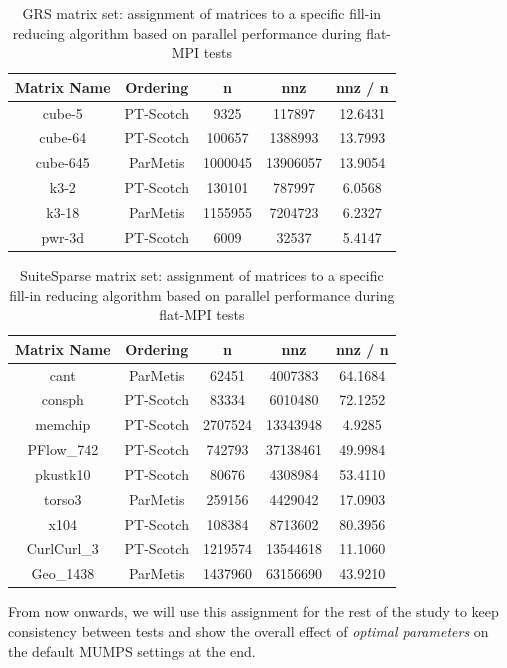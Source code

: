 \begin{table}[htpb]
\centering
\begin{tabular}{|c|c|c|c|c|}
\hline
Matrix Name & Ordering  & n       & nnz      & nnz / n \\ \hline
cube-5      & PT-Scotch & 9325    & 117897   & 12.6431 \\ \hline
cube-64     & PT-Scotch & 100657  & 1388993  & 13.7993 \\ \hline
cube-645    & ParMetis  & 1000045 & 13906057 & 13.9054 \\ \hline
k3-2        & PT-Scotch & 130101  & 787997   & 6.0568  \\ \hline
k3-18       & ParMetis  & 1155955 & 7204723  & 6.2327  \\ \hline
pwr-3d      & PT-Scotch & 6009    & 32537    & 5.4147  \\ \hline
\end{tabular}
\caption{GRS matrix set: assignment of matrices to a specific fill-in reducing algorithm based on parallel performance during flat-MPI tests}
\label{table:GRS-ordering-assignment}
\end{table}


\begin{table}[htpb]
\centering
\begin{tabular}{|c|c|c|c|c|}
\hline
Matrix Name & Ordering  & n       & nnz      & nnz / n \\ \hline
cant        & ParMetis  & 62451   & 4007383  & 64.1684 \\ \hline
consph      & PT-Scotch & 83334   & 6010480  & 72.1252 \\ \hline
memchip     & PT-Scotch & 2707524 & 13343948 & 4.9285  \\ \hline
PFlow\_742  & PT-Scotch & 742793  & 37138461 & 49.9984 \\ \hline
pkustk10    & PT-Scotch & 80676   & 4308984  & 53.4110 \\ \hline
torso3      & ParMetis  & 259156  & 4429042  & 17.0903 \\ \hline
x104        & PT-Scotch & 108384  & 8713602  & 80.3956 \\ \hline
CurlCurl\_3 & PT-Scotch & 1219574 & 13544618 & 11.1060 \\ \hline
Geo\_1438   & ParMetis  & 1437960 & 63156690 & 43.9210 \\ \hline
\end{tabular}
\caption{SuiteSparse matrix set: assignment of matrices to a specific fill-in reducing algorithm based on parallel performance during flat-MPI tests}
\label{table:SuiteSparse-ordering-assignment}
\end{table}



From now onwards, we will use this assignment for the rest of the study to keep consistency between tests and show the overall effect of 
\textit{optimal parameters} on the default MUMPS settings at the end. \\